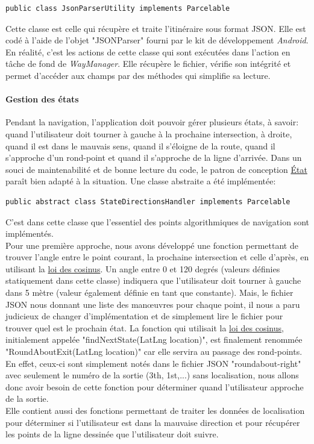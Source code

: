 \begin{lstlisting}
public class JsonParserUtility implements Parcelable
\end{lstlisting}

Cette classe est celle qui récupère et traite l'itinéraire sous format JSON. Elle est codé à l'aide de l'objet "JSONParser" fourni par le kit de développement \textit{Android}. En réalité, c'est les actions de cette classe qui sont exécutées dans l'action en tâche de fond de \textit{WayManager}. Elle récupère le fichier, vérifie son intégrité et permet d'accéder aux champs par des méthodes qui simplifie sa lecture. 

\paragraph{Gestion des états}
Pendant la navigation, l'application doit pouvoir gérer plusieurs états, à savoir: quand l'utilisateur doit tourner à gauche à la prochaine intersection, à droite, quand il est dans le mauvais sens, quand il s'éloigne de la route, quand il s'approche d'un rond-point et quand il s'approche de la ligne d'arrivée. Dans un souci de maintenabilité et de bonne lecture du code, le patron de conception \underline{État} paraît bien adapté à la situation. Une classe abstraite a été implémentée:

\begin{lstlisting}
public abstract class StateDirectionsHandler implements Parcelable
\end{lstlisting}

C'est dans cette classe que l'essentiel des points algorithmiques de navigation sont implémentés.\\Pour une première approche, nous avons développé une fonction permettant de trouver l'angle entre le point courant, la prochaine intersection et celle d'après, en utilisant la \underline{loi des cosinus}. Un angle entre 0 et 120 degrés (valeurs définies statiquement dans cette classe) indiquera que l'utilisateur doit tourner à gauche dans 5 mètre (valeur également définie en tant que constante). Mais, le fichier JSON nous donnant une liste des manœuvres pour chaque point, il nous a paru judicieux de changer d'implémentation et de simplement lire le fichier pour trouver quel est le prochain état. La fonction qui utilisait la \underline{loi des cosinus}, initialement appelée "findNextState(LatLng location)", est finalement renommée "RoundAboutExit(LatLng location)" car elle servira au passage des rond-points. En effet, ceux-ci sont simplement notés dans le fichier JSON "roundabout-right" avec seulement le numéro de la sortie (3th, 1st,...) sans localisation, nous allons donc avoir besoin de cette fonction pour déterminer quand l'utilisateur approche de la sortie.\\
Elle contient aussi des fonctions permettant de traiter les données de localisation pour déterminer si l'utilisateur est dans la mauvaise direction et pour récupérer les points de la ligne dessinée que l'utilisateur doit suivre.

